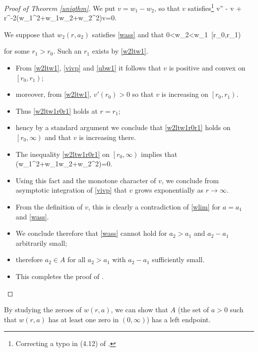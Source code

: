 \begin{proof}[Proof of Theorem \ref{uniqthm}]
    We put $v = w_1-w_2$, so that $v$ satisfies\footnote{Correcting a 
    typo in (4.12) of \cite{coffm}.}
    \be\label{vivp} v'' - v + r^{-2}\left(w_1^2+w_1w_2+w_2^2\right)v=0.\ee

    We suppose that $w_2(r,a_2)$ satisfies \eqref{wass} and that
    \be\label{w2ltw1r0r1} 0<w_2<w_1\quad{}~\left[r_0,r_1\right)\ee

    for some $r_1>r_0$. Such an $r_1$ exists by \eqref{w2ltw1}.
    \begin{itemize}
        \item From \eqref{w2ltw1}, \eqref{vivp} and \eqref{ubw1} it follows that
            $v$ is positive and convex on $\left[r_0, r_1\right)$; 
        \item moreover, from \eqref{w2ltw1}, $v'(r_0)>0$ so that $v$ is
            increasing on $\left[r_0, r_1\right)$. 
        \item Thus \eqref{w2ltw1r0r1} holds at $r=r_1$;
        \item hency by a standard argument we conclude that \eqref{w2ltw1r0r1}
            holds on $\left[r_0, \infty\right)$ and that $v$ is increasing
            there. 
        \item The inequality \eqref{w2ltw1r0r1} on $\left[r_0, \infty\right)$
            implies that
            \be\label{wlimsumsq}
                \left(w_1^2+w_1w_2+w_2^2\right)=0.
            \ee
        \item Using this fact and the monotone character of $v$, we conclude
            from asymptotic integration of \eqref{vivp} that $v$ grows
            exponentially as $r\to\infty$.
        \item From the definition of $v$, this is clearly a contradiction of
            \eqref{wlim} for $a=a_1$ and \eqref{wass}. 
        \item We conclude therefore that \eqref{wass} cannot hold for $a_2>a_1$
            and $a_2-a_1$ arbitrarily small;
        \item therefore $a_2\in A$ for all $a_2>a_1$ with $a_2-a_1$ sufficiently
            small. 
        \item This completes the proof of .
    \end{itemize}
\end{proof}

% 
% 
By studying the zeroes of $w(r,a)$, we can show that $A$ (the set of $a>0$
such that $w(r, a)$ has at least one zero in $(0, \infty)$) has a left
endpoint.

